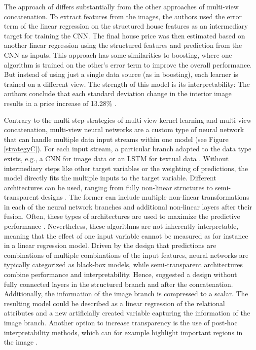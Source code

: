 \documentclass[letterpaper]{article} %
\begin{document}
The approach of \citeauthor{naumzik2020one} \citeyearpar{naumzik2020one} differs substantially from the other approaches of multi-view concatenation. To extract features from the images, the authors used the error term of the linear regression on the structured house features as an intermediary target for training the CNN. The final house price was then estimated based on another linear regression using the structured features and prediction from the CNN as inputs. This approach has some similarities to boosting, where one algorithm is trained on the other's error term to improve the overall performance. But instead of using just a single data source (as in boosting), each learner is trained on a different view. The strength of this model is its interpretability: The authors conclude that each standard deviation change in the interior image results in a price increase of 13.28\% \cite{naumzik2020one}.

Contrary to the multi-step strategies of multi-view kernel learning and multi-view concatenation, multi-view neural networks are a custom type of neural network that can handle multiple data input streams within one model (see Figure \ref{strategyC}). For each input stream, a particular branch adapted to the data type exists, e.g., a CNN for image data or an LSTM for textual data \cite{li2018survey}. Without intermediary steps like other target variables or the weighting of predictions, the model directly fits the multiple inputs to the target variable. Different architectures can be used, ranging from fully non-linear structures to semi-transparent designs \cite{law2019take}. The former can include multiple non-linear transformations in each of the neural network branches and additional non-linear layers after their fusion. Often, these types of architectures are used to maximize the predictive performance \cite{law2019take}. Nevertheless, these algorithms are not inherently interpretable, meaning that the effect of one input variable cannot be measured as for instance in a linear regression model. Driven by the design that predictions are combinations of multiple combinations of the input features, neural networks are typically categorized as black-box models, while semi-transparent architectures combine performance and interpretability. Hence, \citeauthor{law2019take} suggested a design without fully connected layers in the structured branch and after the concatenation. Additionally, the information of the image branch is compressed to a scalar. The resulting model could be described as a linear regression of the relational attributes and a new artificially created variable capturing the information of the image branch. Another option to increase transparency is the use of post-hoc interpretability methods, which can for example highlight important regions in the image \cite{kucklick2020location}.
\end{document}
